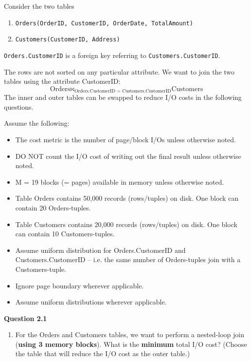   \begin{example}
    Consider the two tables
    \begin{enumerate}
      \item \texttt{Orders(OrderID, CustomerID, OrderDate, TotalAmount)} 
      \item \texttt{Customers(CustomerID, Address)}
    \end{enumerate}
    \texttt{Orders.CustomerID} is a foreign key referring to \texttt{Customers.CustomerID}.

    The rows are not sorted on any particular attribute. We want to join the two tables using the attribute CustomerID:
    \[
    \text{Orders} \bowtie_{\text{Orders.CustomerID = Customers.CustomerID}} \text{Customers}
    \]
    The inner and outer tables can be swapped to reduce I/O costs in the following questions.

    Assume the following:
    \begin{itemize}
      \item The cost metric is the number of page/block I/Os unless otherwise noted.
      \item DO NOT count the I/O cost of writing out the final result unless otherwise noted.
      \item M = 19 blocks (= pages) available in memory unless otherwise noted.
      \item Table Orders contains 50,000 records (rows/tuples) on disk. One block can contain 20 Orders-tuples.
      \item Table Customers contains 20,000 records (rows/tuples) on disk. One block can contain 10 Customers-tuples.
      \item Assume uniform distribution for Orders.CustomerID and Customers.CustomerID -- i.e. the same number of Orders-tuples join with a Customers-tuple.
      \item Ignore page boundary wherever applicable.
      \item Assume uniform distributions wherever applicable.
    \end{itemize}

    \vspace{1em}
    \noindent\textbf{Question 2.1}
    \begin{enumerate}[label=(\alph*)]
      \item For the Orders and Customers tables, we want to perform a nested-loop join (\textbf{using 3 memory blocks}). What is the \textbf{minimum} total I/O cost? (Choose the table that will reduce the I/O cost as the outer table.)
      

\end{enumerate}
\end{example}
